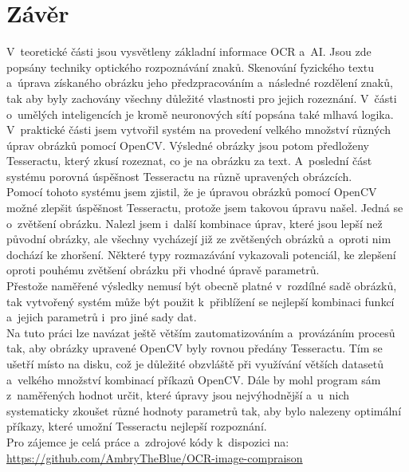 \documentclass[12pt,oneside]{report}			%
\begin{document}
	\chapter*{Závěr}
	V~teoretické části jsou vysvětleny základní informace \gls{OCR} a~\gls{AI}. Jsou zde popsány techniky optického rozpoznávání znaků. Skenování fyzického textu a~úprava získaného obrázku jeho předzpracováním a~následné rozdělení znaků, tak aby byly zachovány všechny důležité vlastnosti pro jejich rozeznání. V~části o~umělých inteligencích je kromě neuronových sítí popsána také mlhavá logika. \\
	V~praktické části jsem vytvořil systém na provedení velkého množství různých úprav obrázků pomocí OpenCV. Výsledné obrázky jsou potom předloženy Tesseractu, který zkusí rozeznat, co je na obrázku za text. A~poslední část systému porovná úspěšnost Tesseractu na různě upravených obrázcích. \\
	Pomocí tohoto systému jsem zjistil, že je úpravou obrázků pomocí OpenCV možné zlepšit úspěšnost Tesseractu, protože jsem takovou úpravu našel. Jedná se o~zvětšení obrázku. Nalezl jsem i~další kombinace úprav, které jsou lepší než původní obrázky, ale všechny vycházejí již ze zvětšených obrázků a~oproti nim dochází ke zhoršení. Některé typy rozmazávání vykazovali potenciál, ke zlepšení oproti pouhému zvětšení obrázku při vhodné úpravě parametrů.\\
	 Přestože naměřené výsledky nemusí být obecně platné v~rozdílné sadě obrázků, tak vytvořený systém může být použit k~přiblížení se nejlepší kombinaci funkcí a~jejich parametrů i~pro jiné sady dat.\\
	 Na tuto práci lze navázat ještě větším zautomatizováním  a~provázáním procesů tak, aby obrázky upravené OpenCV byly rovnou předány Tesseractu. Tím se ušetří místo na disku, což je důležité obzvláště při využívání větších datasetů a~velkého množství kombinací příkazů OpenCV. Dále by mohl program sám z~naměřených hodnot určit, které úpravy jsou nejvýhodnější a~u~nich systematicky zkoušet různé hodnoty parametrů tak, aby bylo nalezeny optimální příkazy, které umožní Tesseractu nejlepší rozpoznání.\\
	 Pro zájemce je celá práce a~zdrojové kódy k~dispozici na: \url{https://github.com/AmbryTheBlue/OCR-image-compraison}
	\nocite{*}
	
	
    \printbibliography					%
	
    \printglossary[title={Zkratky}]		%
    \listoffigures				%
   
\end{document}

